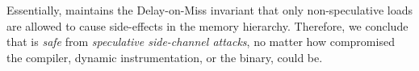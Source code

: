 
Essentially, {\recomp} maintains the Delay-on-Miss invariant that only non-speculative loads are allowed to cause side-effects in the memory hierarchy. 
Therefore, we conclude that {\recomp} is \emph{safe} from \emph{speculative side-channel attacks}, no matter how compromised the compiler, dynamic instrumentation, or the binary, could be.
